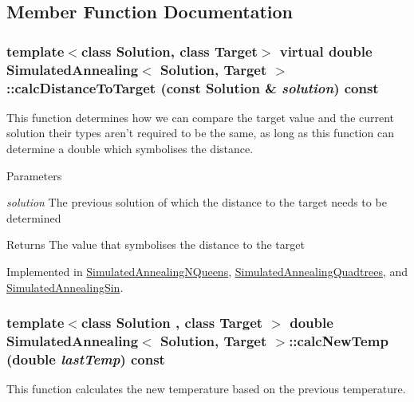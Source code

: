 \subsection{Member Function Documentation}
\hypertarget{class_simulated_annealing_ac68b8a3c38d3095893498b9a7e292346}{
\subsubsection[{calcDistanceToTarget}]{\setlength{\rightskip}{0pt plus 5cm}template$<$class Solution, class Target$>$ virtual double {\bf SimulatedAnnealing}$<$ Solution, Target $>$::calcDistanceToTarget (const Solution \& {\em solution}) const}}
\label{class_simulated_annealing_ac68b8a3c38d3095893498b9a7e292346}
This function determines how we can compare the target value and the current solution their types aren't required to be the same, as long as this function can determine a double which symbolises the distance. 
\begin{DoxyParams}{Parameters}
\item[{\em solution}]The previous solution of which the distance to the target needs to be determined \end{DoxyParams}
\begin{DoxyReturn}{Returns}
The value that symbolises the distance to the target 
\end{DoxyReturn}


Implemented in \hyperlink{class_simulated_annealing_n_queens_a1cd2713f3c67f9c0b4d6ce64d31690ad}{SimulatedAnnealingNQueens}, \hyperlink{class_simulated_annealing_quadtrees_ab067118f2ceecfe6b447b5fb7585a763}{SimulatedAnnealingQuadtrees}, and \hyperlink{class_simulated_annealing_sin_a064890c05ac35e04b71ce6a1405f1e36}{SimulatedAnnealingSin}.\hypertarget{class_simulated_annealing_aa9cc1b49fb6f1f96b221c013e6ff7f00}{
\subsubsection[{calcNewTemp}]{\setlength{\rightskip}{0pt plus 5cm}template$<$class Solution , class Target $>$ double {\bf SimulatedAnnealing}$<$ Solution, Target $>$::calcNewTemp (double {\em lastTemp}) const}}
\label{class_simulated_annealing_aa9cc1b49fb6f1f96b221c013e6ff7f00}
This function calculates the new temperature based on the previous temperature.

